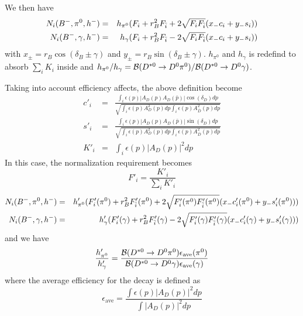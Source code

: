We then have 
\begin{eqnarray}
 N_i({{{B}^-}}, \pi^0, h^-)  &=&  h_{\pi^0}( F_i + r^2_BF_{\bar{i}}  + 2\sqrt{F_iF_{\bar{i}}} (x_-c_i + y_-s_i ) )  \\
N_i({{{B}^-}}, \gamma, h^-)  &=& h_{\gamma}( F_i + r^2_BF_{\bar{i}}  - 2\sqrt{F_iF_{\bar{i}}} (x_-c_i + y_-s_i ) )
 \end{eqnarray} 
with $x_{\pm} = r_B \cos(\delta_B \pm \gamma)$ and $y_{\pm} = r_B \sin(\delta_B \pm \gamma)$.
$h_{\pi^0}$ and $h_{\gamma}$ is redefind to absorb $\sum_i K_i$ inside and $h_{\pi^0}/h_{\gamma} = {\mathcal{B}}(D^{*0} \rightarrow D^0 \pi^0)/{\mathcal{B}}(D^{*0} \rightarrow D^0 \gamma)$.

Taking into account efficiency affects, the above definition become
\begin{eqnarray}
c'_i &=& \frac{\int_i \epsilon(p) |A_D(p)A_D(\bar{p})|\cos(\delta_D)dp}{\sqrt{\int_i \epsilon(p) A^2_D(p)dp \int_i  \epsilon(p) A^2_{\bar{D}}(p)dp}}\\
s'_i  &=&  \frac{\int_i  \epsilon(p) |A_D(p)A_D(\bar{p})|\sin(\delta_D)dp}{\sqrt{\int_i \epsilon(p)  A^2_D(p)dp \int_i \epsilon(p) A^2_{\bar{D}}(p)dp}}\\
K'_i &=& \int _i \epsilon(p) |A_D(p)|^2 dp
\end{eqnarray}
In this case, the normalization requirement becomes
\begin{equation}
F'_i = \frac{K'_i}{\sum_i K'_i}
\end{equation}
\begin{eqnarray}
 N_i({{{B}^-}}, \pi^0, h^-)  &=&  h'_{\pi^0}( F'_i(\pi^0) + r^2_BF'_{\bar{i}}(\pi^0)  + 2\sqrt{F'_i(\pi^0)F'_{\bar{i}}(\pi^0)} (x_-c'_i(\pi^0) + y_-s'_i(\pi^0) ) )  \\
N_i({{{B}^-}}, \gamma, h^-)  &=& h'_{\gamma}( F'_i(\gamma) + r^2_BF'_{\bar{i}}(\gamma)  - 2\sqrt{F'_i(\gamma)F'_{\bar{i}}(\gamma)} (x_-c'_i(\gamma) + y_-s'_i(\gamma) ) )
 \end{eqnarray} 
and we have 
\begin{equation}
\frac{h'_{\pi^0}}{h'_{\gamma}} = \frac{{\mathcal{B}}(D^{*0} \rightarrow D^0 \pi^0) \epsilon_{\textrm{ave}}(\pi^0)}{{\mathcal{B}}(D^{*0} \rightarrow D^0 \gamma) \epsilon_{\textrm{ave}}(\gamma)}
\end{equation}
where the average efficiency for the decay is defined as
\begin{equation}
\epsilon_{\textrm{ave}} = \frac{\int \epsilon(p) |A_D(p)|^2 dp}{ \int  |A_D(p)|^2 dp}
\end{equation} 

